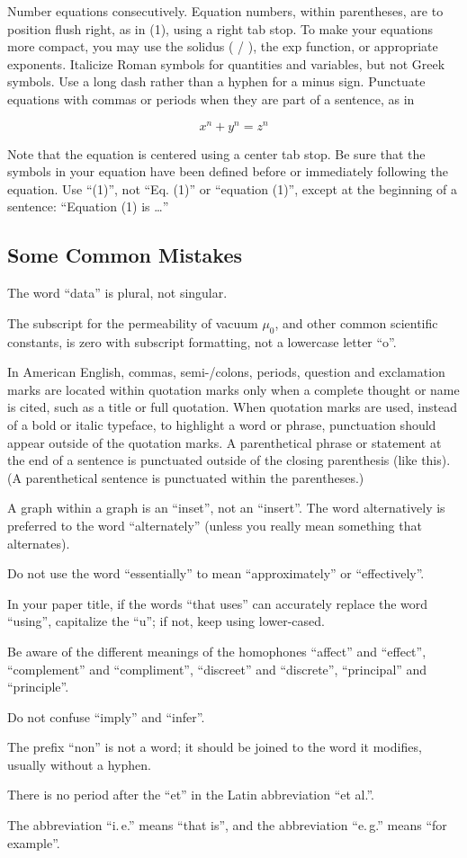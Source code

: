 \documentclass[conference,a4paper,flushend]{neutr}
\begin{document}
Number equations consecutively. Equation numbers, within parentheses, are to position flush right, as in (1), using a right tab stop. To make your equations more compact, you may use the solidus ( / ), the exp function, or appropriate exponents. Italicize Roman symbols for quantities and variables, but not Greek symbols. Use a long dash rather than a hyphen for a minus sign. Punctuate equations with commas or periods when they are part of a sentence, as in

\[ x^n + y^n = z^n \]

Note that the equation is centered using a center tab stop. Be sure that the symbols in your equation have been defined before or immediately following the equation. Use “(1)”, not “Eq. (1)” or “equation (1)”, except at the beginning of a sentence: “Equation (1) is \ldots”

\subsection{Some Common Mistakes}

\begin{compactitem}
\item The word “data” is plural, not singular.
\item The subscript for the permeability of vacuum $\mu_0$, and other common scientific constants, is zero with subscript formatting, not a lowercase letter “o”.
\item In American English, commas, semi-/colons, periods, question and exclamation marks are located within quotation marks only when a complete thought or name is cited, such as a title or full quotation. When quotation marks are used, instead of a bold or italic typeface, to highlight a word or phrase, punctuation should appear outside of the quotation marks. A parenthetical phrase or statement at the end of a sentence is punctuated outside of the closing parenthesis (like this). (A parenthetical sentence is punctuated within the parentheses.)
\item A graph within a graph is an “inset”, not an “insert”. The word alternatively is preferred to the word “alternately” (unless you really mean something that alternates).
\item Do not use the word “essentially” to mean “approximately” or “effectively”.
\item In your paper title, if the words “that uses” can accurately replace the word “using”, capitalize the “u”; if not, keep using lower-cased.
\item Be aware of the different meanings of the homophones “affect” and “effect”, “complement” and “compliment”, “discreet” and “discrete”, “principal” and “principle”.
\item Do not confuse “imply” and “infer”.
\item The prefix “non” is not a word; it should be joined to the word it modifies, usually without a hyphen.
\item There is no period after the “et” in the Latin abbreviation “et al.”.
\item The abbreviation “i.\,e.” means “that is”, and the abbreviation “e.\,g.” means “for example”.
\end{compactitem}
\end{document}
